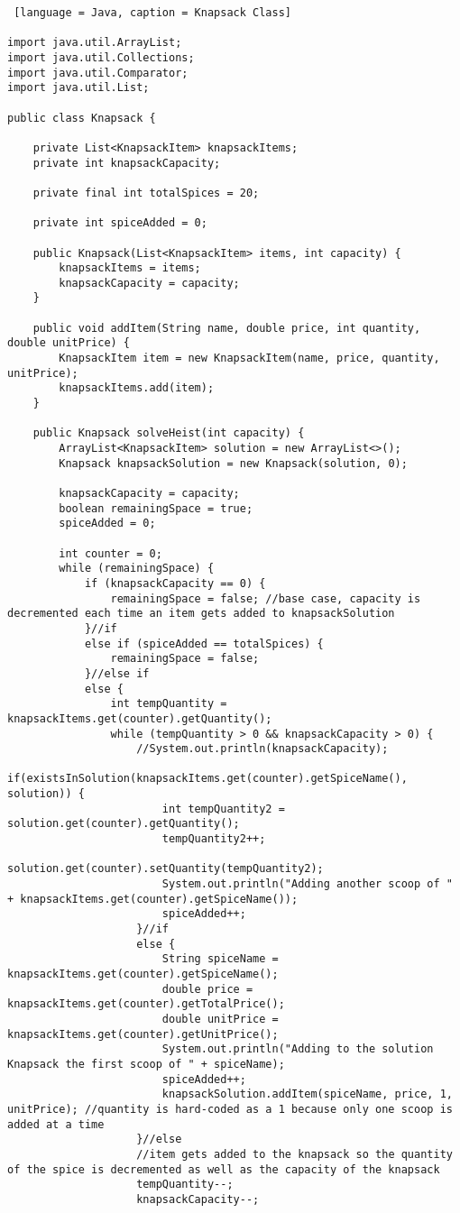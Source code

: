 \documentclass{article}
\begin{document}
\begin{lstlisting} [language = Java, caption = Knapsack Class]

import java.util.ArrayList;
import java.util.Collections;
import java.util.Comparator;
import java.util.List;

public class Knapsack {

    private List<KnapsackItem> knapsackItems;
    private int knapsackCapacity;

    private final int totalSpices = 20;

    private int spiceAdded = 0;

    public Knapsack(List<KnapsackItem> items, int capacity) {
        knapsackItems = items;
        knapsackCapacity = capacity;
    }

    public void addItem(String name, double price, int quantity, double unitPrice) {
        KnapsackItem item = new KnapsackItem(name, price, quantity, unitPrice);
        knapsackItems.add(item);
    }
    
    public Knapsack solveHeist(int capacity) {
        ArrayList<KnapsackItem> solution = new ArrayList<>();
        Knapsack knapsackSolution = new Knapsack(solution, 0);

        knapsackCapacity = capacity;
        boolean remainingSpace = true;
        spiceAdded = 0;

        int counter = 0;
        while (remainingSpace) {
            if (knapsackCapacity == 0) {
                remainingSpace = false; //base case, capacity is decremented each time an item gets added to knapsackSolution
            }//if
            else if (spiceAdded == totalSpices) {
                remainingSpace = false;
            }//else if
            else {
                int tempQuantity = knapsackItems.get(counter).getQuantity();
                while (tempQuantity > 0 && knapsackCapacity > 0) {
                    //System.out.println(knapsackCapacity);
                    if(existsInSolution(knapsackItems.get(counter).getSpiceName(), solution)) {
                        int tempQuantity2 = solution.get(counter).getQuantity();
                        tempQuantity2++;
                        solution.get(counter).setQuantity(tempQuantity2);
                        System.out.println("Adding another scoop of " + knapsackItems.get(counter).getSpiceName());
                        spiceAdded++;
                    }//if
                    else {
                        String spiceName = knapsackItems.get(counter).getSpiceName();
                        double price = knapsackItems.get(counter).getTotalPrice();
                        double unitPrice = knapsackItems.get(counter).getUnitPrice();
                        System.out.println("Adding to the solution Knapsack the first scoop of " + spiceName);
                        spiceAdded++;
                        knapsackSolution.addItem(spiceName, price, 1, unitPrice); //quantity is hard-coded as a 1 because only one scoop is added at a time
                    }//else
                    //item gets added to the knapsack so the quantity of the spice is decremented as well as the capacity of the knapsack
                    tempQuantity--;
                    knapsackCapacity--;


\end{lstlisting}
\end{document}
